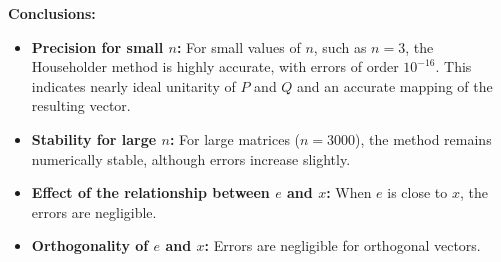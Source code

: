 \textbf{Conclusions:}
\begin{itemize}
    \item \textbf{Precision for small \( n \):} For small values of \( n \), such as \( n = 3 \), the Householder method is highly accurate, with errors of order \( 10^{-16} \). This indicates nearly ideal unitarity of \( P \) and \( Q \) and an accurate mapping of the resulting vector.
    \item \textbf{Stability for large \( n \):} For large matrices (\( n = 3000 \)), the method remains numerically stable, although errors increase slightly.
    \item \textbf{Effect of the relationship between \( e \) and \( x \):} When \( e \) is close to \( x \), the errors are negligible.
    \item \textbf{Orthogonality of \( e \) and \( x \):} Errors are negligible for orthogonal vectors.

\end{itemize}

